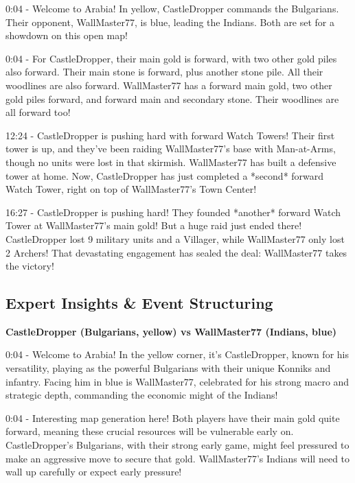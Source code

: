 0:04 - Welcome to Arabia! In yellow, CastleDropper commands the Bulgarians. Their opponent, WallMaster77, is blue, leading the Indians. Both are set for a showdown on this open map! \par \vspace{1em}

0:04 - For CastleDropper, their main gold is forward, with two other gold piles also forward. Their main stone is forward, plus another stone pile. All their woodlines are also forward. WallMaster77 has a forward main gold, two other gold piles forward, and forward main and secondary stone. Their woodlines are all forward too! \par \vspace{1em}

12:24 - CastleDropper is pushing hard with forward Watch Towers! Their first tower is up, and they've been raiding WallMaster77's base with Man-at-Arms, though no units were lost in that skirmish. WallMaster77 has built a defensive tower at home. Now, CastleDropper has just completed a *second* forward Watch Tower, right on top of WallMaster77's Town Center! \par \vspace{1em}

16:27 - CastleDropper is pushing hard! They founded *another* forward Watch Tower at WallMaster77's main gold! But a huge raid just ended there! CastleDropper lost 9 military units and a Villager, while WallMaster77 only lost 2 Archers! That devastating engagement has sealed the deal: WallMaster77 takes the victory! \par \vspace{1em}

\subsection{Expert Insights \& Event Structuring}
\textbf{CastleDropper (Bulgarians, yellow) vs WallMaster77 (Indians, blue)}

0:04 - Welcome to Arabia! In the yellow corner, it's CastleDropper, known for his versatility, playing as the powerful Bulgarians with their unique Konniks and infantry. Facing him in blue is WallMaster77, celebrated for his strong macro and strategic depth, commanding the economic might of the Indians! \par \vspace{1em}

0:04 - Interesting map generation here! Both players have their main gold quite forward, meaning these crucial resources will be vulnerable early on. CastleDropper's Bulgarians, with their strong early game, might feel pressured to make an aggressive move to secure that gold. WallMaster77's Indians will need to wall up carefully or expect early pressure! \par \vspace{1em}

